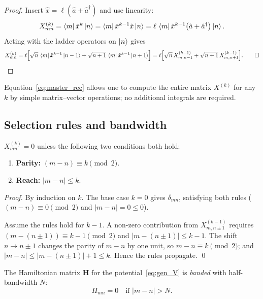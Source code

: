 \begin{proof}
Insert $\hat x = \ell(\hat a+\hat a^\dagger)$ and use linearity:
\[
  X^{(k)}_{mn}
  = \bra{m}\hat x^k\ket{n}
  = \bra{m}\hat x^{k-1}\hat x\ket{n}
  = \ell\,\bra{m}\hat x^{k-1}\bigl(\hat a+\hat a^\dagger\bigr)\ket{n}.
\]
Acting with the ladder operators on $\ket{n}$ gives
\[
  X^{(k)}_{mn}
  = \ell\Bigl[\sqrt{n}\,\bra{m}\hat x^{k-1}\ket{n-1}
             + \sqrt{n+1}\,\bra{m}\hat x^{k-1}\ket{n+1}\Bigr]
  = \ell\Bigl[\sqrt{n}\,X^{(k-1)}_{m,n-1}
             + \sqrt{n+1}\,X^{(k-1)}_{m,n+1}\Bigr]. \qed
\]
\end{proof}

Equation~\eqref{eq:master_rec} allows one to compute the entire matrix
$X^{(k)}$ for any $k$ by simple matrix--vector operations; no additional
integrals are required.

\subsection{Selection rules and bandwidth}\label{sec:selection}

\begin{result}\label{res:selection}
  $X^{(k)}_{mn} = 0$ unless the following two conditions both hold:
  \begin{enumerate}
    \item \textbf{Parity:} $(m-n) \equiv k \pmod{2}$.
    \item \textbf{Reach:} $|m-n| \leq k$.
  \end{enumerate}
\end{result}

\begin{proof}
By induction on $k$.  The base case $k=0$ gives $\delta_{mn}$, satisfying
both rules ($(m-n) \equiv 0 \pmod 2$ and $|m-n|=0\leq 0$).

Assume the rules hold for $k-1$.  A non-zero contribution from
$X^{(k-1)}_{m,n\pm 1}$ requires $(m-(n\pm1))\equiv k-1\pmod 2$ and
$|m-(n\pm 1)|\leq k-1$.  The shift $n\to n\pm 1$ changes the parity of
$m-n$ by one unit, so $m-n\equiv k\pmod 2$; and $|m-n|\leq|m-(n\pm1)|+1\leq
k$.  Hence the rules propagate. \qed
\end{proof}

\begin{result}[Bandwidth]\label{res:bandwidth}
  The Hamiltonian matrix $\mathbf{H}$ for the potential~\eqref{eq:gen_V} is
  \emph{banded} with half-bandwidth $N$:
  \begin{equation}
    H_{mn} = 0 \quad \text{if } |m-n| > N.
  \end{equation}
\end{result}

